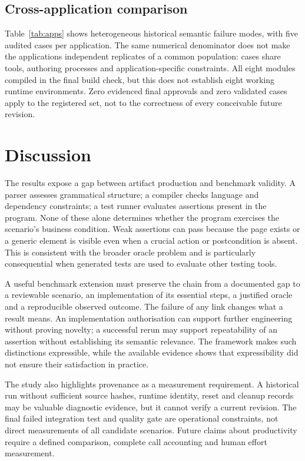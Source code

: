 \documentclass[pdflatex,sn-mathphys-num]{sn-jnl}
\begin{document}
\subsection{Cross-application comparison}
Table~\ref{tab:apps} shows heterogeneous historical semantic failure modes, with five audited cases per application. The same numerical denominator does not make the applications independent replicates of a common population: cases share tools, authoring processes and application-specific constraints. All eight modules compiled in the final build check, but this does not establish eight working runtime environments. Zero evidenced final approvals and zero validated cases apply to the registered set, not to the correctness of every conceivable future revision.

\section{Discussion}\label{sec:discussion}
The results expose a gap between artifact production and benchmark validity. A parser assesses grammatical structure; a compiler checks language and dependency constraints; a test runner evaluates assertions present in the program. None of these alone determines whether the program exercises the scenario's business condition. Weak assertions can pass because the page exists or a generic element is visible even when a crucial action or postcondition is absent. This is consistent with the broader oracle problem \cite{barr2015oracle} and is particularly consequential when generated tests are used to evaluate other testing tools.

A useful benchmark extension must preserve the chain from a documented gap to a reviewable scenario, an implementation of its essential steps, a justified oracle and a reproducible observed outcome. The failure of any link changes what a result means. An implementation authorisation can support further engineering without proving novelty; a successful rerun may support repeatability of an assertion without establishing its semantic relevance. The framework makes such distinctions expressible, while the available evidence shows that expressibility did not ensure their satisfaction in practice.

The study also highlights provenance as a measurement requirement. A historical run without sufficient source hashes, runtime identity, reset and cleanup records may be valuable diagnostic evidence, but it cannot verify a current revision. The final failed integration test and quality gate are operational constraints, not direct measurements of all candidate scenarios. Future claims about productivity require a defined comparison, complete call accounting and human effort measurement.
\end{document}
